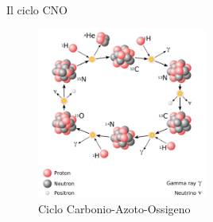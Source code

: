\documentclass [xcolor=svgnames] {beamer}
\begin{document}
	\begin{frame}{Il ciclo CNO}
		\begin{figure}[H]
			\includegraphics[width=0.5\textwidth]{img/CNO_Cycle.pdf}
			\caption{Ciclo Carbonio-Azoto-Ossigeno}
		\end{figure}
	\end{frame}
	
	
	
%	
%	
%	
%	
%	
\end{document}
